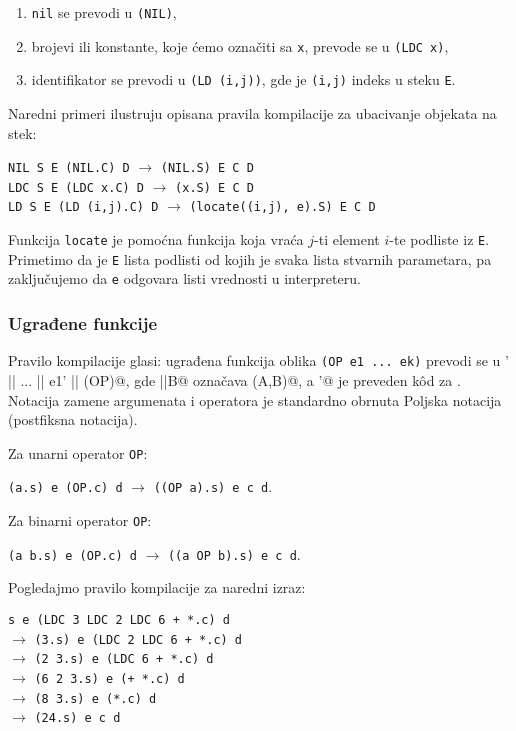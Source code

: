 \begin{enumerate}
	\item \verb|nil| se prevodi u \verb|(NIL)|,
	\item brojevi ili konstante, koje ćemo označiti sa \verb|x|, prevode se u \verb|(LDC x)|,
	\item identifikator se prevodi u \verb|(LD (i,j))|, gde je \verb|(i,j)| indeks u steku \verb|E|.
\end{enumerate}

\begin{primer} Naredni primeri ilustruju opisana pravila kompilacije za ubacivanje objekata na stek:
	\begin{center}
		\verb|NIL S E (NIL.C) D| $\rightarrow$ \verb|(NIL.S) E C D|\\
		\verb|LDC S E (LDC x.C) D| $\rightarrow$ \verb|(x.S) E C D|\\
		\verb|LD S E (LD (i,j).C) D| $\rightarrow$ \verb|(locate((i,j), e).S) E C D|
	\end{center}
\end{primer}

Funkcija \verb|locate| je pomoćna funkcija koja vraća $j$-ti element $i$-te podliste iz \verb|E|. Primetimo da je \verb|E| lista podlisti od kojih je svaka lista stvarnih parametara, pa zaključujemo da \verb|e| odgovara listi vrednosti u interpreteru.

\subsubsection{Ugrađene funkcije}

Pravilo kompilacije glasi: ugrađena funkcija oblika \verb|(OP e1 ... ek)| prevodi se u \verb@ek' || ... || e1' || (OP)@, gde \verb@A||B@ označava \verb@append(A,B)@, a \verb@ei'@ je preveden k\^od za \verb@ei@. Notacija zamene argumenata i operatora je standardno obrnuta Poljska notacija (postfiksna notacija).

Za unarni operator \verb|OP|:
\begin{center}
	\verb|(a.s) e (OP.c) d| $\rightarrow$ \verb|((OP a).s) e c d|.
\end{center}

Za binarni operator \verb|OP|:
\begin{center}
	\verb|(a b.s) e (OP.c) d| $\rightarrow$ \verb|((a OP b).s) e c d|.
\end{center}

\begin{primer} Pogledajmo pravilo kompilacije za naredni izraz:
	\begin{center}
		\verb|s e (LDC 3 LDC 2 LDC 6 + *.c) d|\\
		$\rightarrow$ \verb|(3.s) e (LDC 2 LDC 6 + *.c) d|\\
		$\rightarrow$ \verb|(2 3.s) e (LDC 6 + *.c) d|\\
		$\rightarrow$ \verb|(6 2 3.s) e (+ *.c) d|\\
		$\rightarrow$ \verb|(8 3.s) e (*.c) d|\\
		$\rightarrow$ \verb|(24.s) e c d|
	\end{center}
\end{primer}

